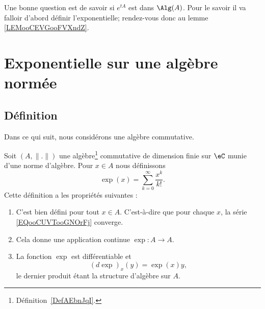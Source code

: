 Une bonne question est de savoir si \(  e^{tA}\) est dans \( \Alg(A)\). Pour le savoir il va falloir d'abord définir l'exponentielle; rendez-vous donc au lemme \ref{LEMooCEVGooFVXndZ}.


\section{Exponentielle sur une algèbre normée}

\subsection{Définition}

Dans ce qui suit, nous considérons une algèbre commutative.
\begin{propositionDef}       \label{DEFooSFDUooMNsgZY}
	Soit \( (A,\| . \|)\) une algèbre\footnote{Définition~\ref{DefAEbnJqI}.} commutative de dimension finie sur \( \eC\) munie d'une norme d'algèbre. Pour \( x\in A\) nous définissons
	\begin{equation}        \label{EQooCUVTooGNOrFj}
		\exp(x)=\sum_{k=0}^{\infty}\frac{ x^k }{ k! }.
	\end{equation}
	Cette définition a les propriétés suivantes :
	\begin{enumerate}
		\item
		      C'est bien défini pour tout \( x\in A\). C'est-à-dire que pour chaque \( x\), la série \eqref{EQooCUVTooGNOrFj} converge.
		\item
		      Cela donne une application continue \( \exp\colon A\to A\).
		\item       \label{ITEMooGGVAooVfhGuu}
		      La fonction \( \exp\) est différentiable et
		      \begin{equation}        \label{EQooKWBUooLUdBAw}
			      (d\exp)_x(y)=\exp(x)y,
		      \end{equation}
		      le dernier produit étant la structure d'algèbre sur \( A\).
	\end{enumerate}
\end{propositionDef}

